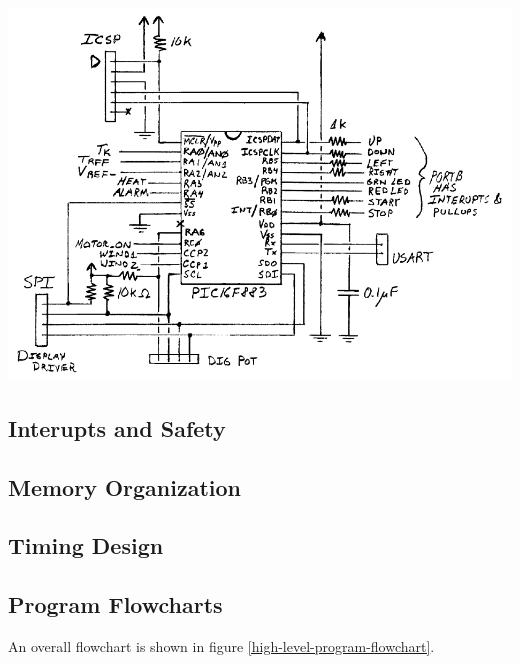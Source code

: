 \documentclass[10pt, twocolumn]{article}
\begin{document}
\begin{center}
	\includegraphics[width=\columnwidth]{Figures/pic16f883-circuit.pdf}
	\label{pic16f883-circuit}
\end{center}

\subsection{Interupts and Safety}

\subsection{Memory Organization}

\subsection{Timing Design}

\subsection{Program Flowcharts}

An overall flowchart is shown in figure
\ref{high-level-program-flowchart}.
\end{document}
